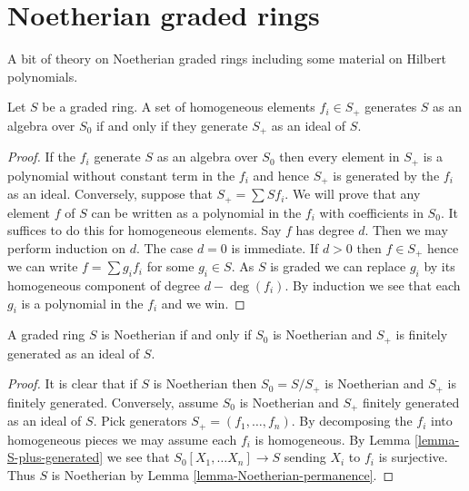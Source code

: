\section{Noetherian graded rings}
\label{section-noetherian-graded}

\noindent
A bit of theory on Noetherian graded rings including some material on
Hilbert polynomials.

\begin{lemma}
\label{lemma-S-plus-generated}
Let $S$ be a graded ring. A set of homogeneous elements
$f_i \in S_{+}$ generates $S$ as an algebra over $S_0$ if
and only if they generate $S_{+}$ as an ideal of $S$.
\end{lemma}

\begin{proof}
If the $f_i$ generate $S$ as an algebra over $S_0$ then every element
in $S_{+}$ is a polynomial without constant term in the $f_i$ and hence
$S_{+}$ is generated by the $f_i$ as an ideal. Conversely, suppose that
$S_{+} = \sum Sf_i$. We will prove that any element $f$ of $S$ can be written
as a polynomial in the $f_i$ with coefficients in $S_0$. It suffices
to do this for homogeneous elements. Say $f$ has degree $d$. Then we may
perform induction on $d$. The case $d = 0$ is immediate. If $d > 0$
then $f \in S_{+}$ hence we can write $f = \sum g_i f_i$
for some $g_i \in S$. As $S$ is graded we can replace $g_i$ by its
homogeneous component of degree $d - \deg(f_i)$. By induction we
see that each $g_i$ is a polynomial in the $f_i$ and we win.
\end{proof}

\begin{lemma}
\label{lemma-graded-Noetherian}
A graded ring $S$ is Noetherian if and only if $S_0$ is
Noetherian and $S_{+}$ is finitely generated as an ideal of $S$.
\end{lemma}

\begin{proof}
It is clear that if $S$ is Noetherian then $S_0 = S/S_{+}$ is Noetherian
and $S_{+}$ is finitely generated. Conversely, assume $S_0$ is Noetherian
and $S_{+}$ finitely generated as an ideal of $S$. Pick generators
$S_{+} = (f_1, \ldots, f_n)$. By decomposing the $f_i$ into homogeneous
pieces we may assume each $f_i$ is homogeneous. By
Lemma \ref{lemma-S-plus-generated}
we see that $S_0[X_1, \ldots X_n] \to S$ sending $X_i$ to $f_i$
is surjective. Thus $S$ is Noetherian by
Lemma \ref{lemma-Noetherian-permanence}.
\end{proof}

